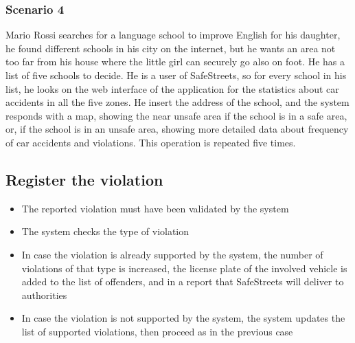 \subsubsection{Scenario 4}
Mario Rossi searches for a language school to improve English for his daughter, he found different schools in his city on the internet, but he wants an area 
not too far from his house where the little girl can securely go also on foot. He has a list of five schools to decide. He is a user of SafeStreets, so 
for every school in his list, he looks on the web interface of the application for the statistics about car accidents in all the five zones. He insert the 
address of the school, and the system responds with a map, showing the near unsafe area if the school is in a safe area, or, if the school is in an unsafe 
area, showing more detailed data about frequency of car accidents and violations. This operation is repeated five times.

\subsection{Register the violation}
\begin{itemize}
    \item The reported violation must have been validated by the system
    \item The system checks the type of violation
    \item In case the violation is already supported by the system, the number of violations of that type is increased, the license plate of the involved vehicle is added to the list of offenders, and in a report that SafeStreets will deliver to authorities
    \item In case the violation is not supported by the system, the system updates the list of supported violations, then proceed as in the previous case
\end{itemize}
